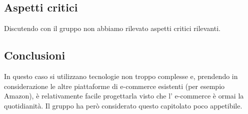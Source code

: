 \subsection{Aspetti critici}
Discutendo con il gruppo non abbiamo rilevato aspetti critici rilevanti.
\subsection{Conclusioni}
In questo caso si utilizzano tecnologie non troppo complesse e, prendendo in considerazione le altre piattaforme di e-commerce esistenti (per esempio Amazon), è relativamente facile progettarla visto che l' e-commerce è ormai la quotidianità. Il gruppo ha però considerato questo capitolato poco appetibile.
